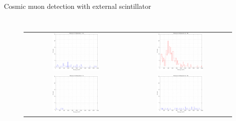 \documentclass[aspectratio=169,xcolor=dvipsnames]{beamer} %
\newcommand\B{\rule[-1.2ex]{0pt}{0pt}} %
\begin{document}
\begin{frame}{Cosmic muon detection with external scintillator}
\begin{columns}
\begin{figure}[h!]
\begin{tabular}{c c}
                    \includegraphics[width=0.47\textwidth]{images/muon_detection/incoming_energy34_2hr_sens2_keV_lin.pdf} & \includegraphics[width=0.47\textwidth]{images/muon_detection/incoming_energy34_2hr_sens3_keV_lin.pdf}\B \\
                    \includegraphics[width=0.47\textwidth]{images/muon_detection/incoming_energy34_2hr_sens1_keV_lin.pdf} & \includegraphics[width=0.47\textwidth]{images/muon_detection/incoming_energy34_2hr_sens4_keV_lin.pdf}
                \end{tabular}
            \end{figure}
    \end{columns}
\end{frame}
\end{document}
